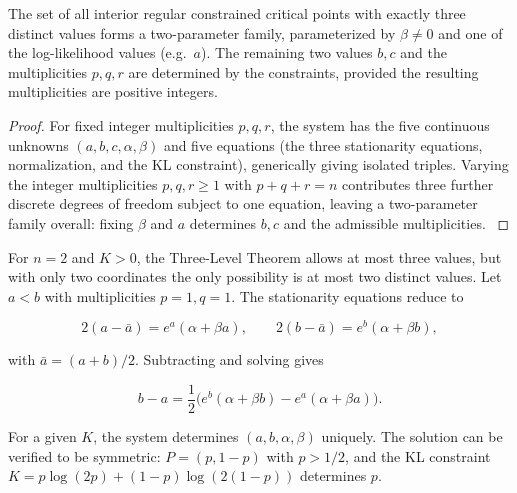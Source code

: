 \begin{corollary}
\label{ch:cor:three-level-family}
The set of all interior regular constrained critical points with
exactly three distinct values forms a two-parameter family, parameterized
by \(\beta\neq0\) and one of the log-likelihood values (e.g.\ \(a\)).
The remaining two values \(b,c\) and the multiplicities \(p,q,r\) are
determined by the constraints, provided the resulting multiplicities are
positive integers.
\end{corollary}

\begin{proof}
For fixed integer multiplicities \(p,q,r\), the system has the five
continuous unknowns \((a,b,c,\alpha,\beta)\) and five equations (the
three stationarity equations, normalization, and the KL constraint),
generically giving isolated triples.  Varying the integer
multiplicities \(p,q,r\ge1\) with \(p+q+r=n\) contributes three further
discrete degrees of freedom subject to one equation, leaving a
two-parameter family overall: fixing \(\beta\) and \(a\) determines
\(b,c\) and the admissible multiplicities. \(\)
\end{proof}

\begin{example}[Binary Case \(n=2\)]
\label{ch:ex:three-level-binary}
For \(n=2\) and \(K>0\), the Three-Level Theorem allows at most three
values, but with only two coordinates the only possibility is at most
two distinct values.  Let \(a<b\) with multiplicities \(p=1,q=1\).
The stationarity equations reduce to

\[
2(a-\bar a)=e^{a}(\alpha+\beta a),\qquad
2(b-\bar a)=e^{b}(\alpha+\beta b),
\]

with \(\bar a=(a+b)/2\).  Subtracting and solving gives

\[
b-a = \frac{1}{2}\bigl(e^{b}(\alpha+\beta b) - e^{a}(\alpha+\beta a)\bigr).
\]

For a given \(K\), the system determines \((a,b,\alpha,\beta)\) uniquely.
The solution can be verified to be symmetric: \(P=(p,1-p)\) with
\(p>1/2\), and the KL constraint \(K = p\log(2p)+(1-p)\log(2(1-p))\)
determines \(p\).
\end{example}

